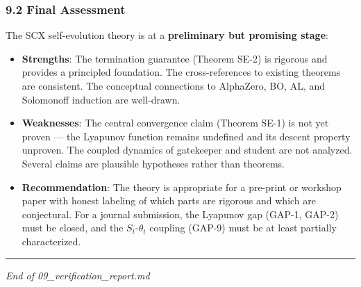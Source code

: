 \documentclass[
  12pt,
]{ctexart}
\begin{document}
\subsubsection{9.2 Final Assessment}\label{final-assessment}

The SCX self-evolution theory is at a \textbf{preliminary but promising
stage}:

\begin{itemize}
\item
  \textbf{Strengths}: The termination guarantee (Theorem SE-2) is
  rigorous and provides a principled foundation. The cross-references to
  existing theorems are consistent. The conceptual connections to
  AlphaZero, BO, AL, and Solomonoff induction are well-drawn.
\item
  \textbf{Weaknesses}: The central convergence claim (Theorem SE-1) is
  not yet proven --- the Lyapunov function remains undefined and its
  descent property unproven. The coupled dynamics of gatekeeper and
  student are not analyzed. Several claims are plausible hypotheses
  rather than theorems.
\item
  \textbf{Recommendation}: The theory is appropriate for a pre-print or
  workshop paper with honest labeling of which parts are rigorous and
  which are conjectural. For a journal submission, the Lyapunov gap
  (GAP-1, GAP-2) must be closed, and the \(S_t\)-\(\theta_t\) coupling
  (GAP-9) must be at least partially characterized.
\end{itemize}

\begin{center}\rule{0.5\linewidth}{0.5pt}\end{center}

\emph{End of 09\_verification\_report.md}
\end{document}
